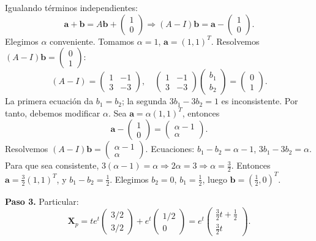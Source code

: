 \begin{example}
\begin{myproof}
Igualando términos independientes:
\[
\mathbf{a}+\mathbf{b}=A\mathbf{b}+\begin{pmatrix}1\\0\end{pmatrix}
\Rightarrow (A-I)\mathbf{b}=\mathbf{a}-\begin{pmatrix}1\\0\end{pmatrix}.
\]
Elegimos $\alpha$ conveniente. Tomamos $\alpha=1$, $\mathbf{a}=(1,1)^T$. Resolvemos $(A-I)\mathbf{b}=
\begin{pmatrix}
0\\1
\end{pmatrix}$:
\[
(A-I)=
\begin{pmatrix}
1&-1\\
3&-3
\end{pmatrix},
\quad
\begin{pmatrix}
1&-1\\
3&-3
\end{pmatrix}
\begin{pmatrix}
b_1\\b_2
\end{pmatrix}
=
\begin{pmatrix}
0\\1
\end{pmatrix}.
\]
La primera ecuación da $b_1=b_2$; la segunda $3b_1-3b_2=1$ es inconsistente. Por tanto, debemos modificar $\alpha$. Sea $\mathbf{a}=\alpha(1,1)^T$, entonces
\[
\mathbf{a}-\begin{pmatrix}1\\0\end{pmatrix}=
\begin{pmatrix}
\alpha-1\\ \alpha
\end{pmatrix}.
\]
Resolvemos $(A-I)\mathbf{b}=
\begin{pmatrix}
\alpha-1\\ \alpha
\end{pmatrix}$.
Ecuaciones: $b_1-b_2=\alpha-1$, $3b_1-3b_2=\alpha$. Para que sea consistente, $3(\alpha-1)=\alpha\Rightarrow 2\alpha=3\Rightarrow \alpha=\frac32$.
Entonces $\mathbf{a}=\frac32(1,1)^T$, y $b_1-b_2=\frac12$. Elegimos $b_2=0$, $b_1=\frac12$, luego $\mathbf{b}=(\frac12,0)^T$.

\textbf{Paso 3.} Particular:
\[
\mathbf{X}_p=t e^t
\begin{pmatrix}
3/2\\3/2
\end{pmatrix}
+e^t
\begin{pmatrix}
1/2\\0
\end{pmatrix}
=
e^t
\begin{pmatrix}
\frac32 t+\frac12\\
\frac32 t
\end{pmatrix}.
\]


\end{myproof}
\end{example}
